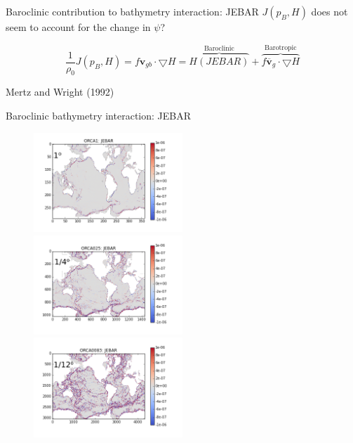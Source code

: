 \documentclass{beamer}
\begin{document}
\begin{frame}{Baroclinic contribution to bathymetry interaction: JEBAR}
$J(p_{B}, H)$ does not seem to account for the change in $\psi$?
\pause
\large
\begin{center}
\begin{equation*}
\dfrac{1}{\rho_{0}} J(p_{B}, H) = f \textbf{v}_{gb} \cdot\bigtriangledown H = \overbrace{H(JEBAR)}^{\text{Baroclinic}}+\overbrace{f\overline{\textbf{v}}_{g} \cdot\bigtriangledown H}^{\text{Barotropic}}
\end{equation*}
\end{center}
\begin{flushright}
\tiny Mertz and Wright (1992)
\end{flushright}
\end{frame}

\begin{frame}{Baroclinic bathymetry interaction: JEBAR}
\begin{center}
\begin{figure}[H]
\centering
\vspace{-0.1cm}
\includegraphics[width=0.5\textwidth]{ORCA1_N406_JEBAR_scientificNotation_P.png}
\includegraphics[width=0.5\textwidth]{ORCA025_N401_JEBAR_scientificNotation_P.png}\\
\vspace{-0.15cm}
\includegraphics[width=0.5\textwidth]{ORCA12_N01_JEBAR_scientificNotation_P.png}
\end{figure}
\end{center}
\end{frame}
\end{document}
